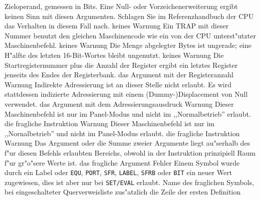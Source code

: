 \documentclass[12pt,a4paper,twoside]{report}
\newcommand{\tty}[1]{{\tt #1}}
\begin{document}
\begin{description}
{                Zieloperand, gemessen in Bits.  Eine Null- oder Vorzeichenerweiterung
                ergibt keinen Sinn mit diesen Argumenten.  Schlagen Sie im 
                Referenzhandbuch der CPU das Verhalten in diesem Fall nach.}
               {keines}
               {Warnung}
               {Ein TRAP mit dieser Nummer benutzt den gleichen Maschinencode
                wie ein von der CPU unterst"utzter Maschinenbefehl.}
               {keines}
               {Warnung}
               {Die Menge abgelegter Bytes ist ungerade; eine H"alfte des letzten
                16-Bit-Wortes bleibt ungenutzt.}
               {keines}
               {Warnung}
               {Die Startregisternummer plus die Anzahl der Register ergibt ein
                letztes Register jenseits des Endes der Registerbank.}
               {das Argument mit der Registeranzahl}
               {Warnung}
               {Indirekte Adressierung ist an dieser Stelle nicht erlaubt.
                Es wird stattdessen indizierte Adressierung mit einem
                (Dummy-)Displacement von Null verwendet.}
               {das Argument mit dem Adressierungsausdruck}
               {Warnung}
               {Dieser Maschinenbefehl ist nur im Panel-Modus und nicht
                im ,,Normalbetrieb'' erlaubt.}
               {die fragliche Instruktion}
               {Warnung}
               {Dieser Maschinenbefehl ist nur im ,,Nornalbetrieb''
                und nicht im Panel-Modus erlaubt.}
               {die fragliche Instruktion}
               {Warnung}
               {Das Argument oder die Summe zweier Argumente
                liegt au"serhalb des f"ur diesen Befehls erlaubten
                Bereichs, obwohl in der Instruktion prinzipiell
                Raum f"ur gr"o"sere Werte ist.}
               {das fragliche Argument}
               {Fehler}
               {Einem Symbol wurde durch ein Label oder
	        \tty{EQU}, \tty{PORT}, \tty{SFR}, \tty{LABEL},
	        \tty{SFRB} oder \tty{BIT} ein neuer  Wert zugewiesen, dies
                ist aber nur bei \tty{SET/EVAL} erlaubt.}
               {Name des fraglichen Symbols, bei eingeschalteter
	        Querverweisliste zus"atzlich die Zeile der ersten Definition}

\end{description}
\end{document}
